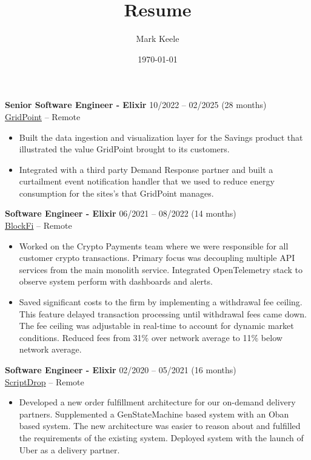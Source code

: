 \documentclass[12pt,letterpaper]{article}
\author{Mark Keele}
\title{Resume}
\date{\today}
\begin{document}
\noindent\textbf{Senior Software Engineer - Elixir}
\hfill{10/2022 -- 02/2025 (28 months)} \\
\href{https://www.gridpoint.com/}{GridPoint} -- Remote

\begin{itemize}

  \item Built the data ingestion and visualization layer for the Savings product that illustrated the value GridPoint brought to its customers.

  \item Integrated with a third party Demand Response partner and built a curtailment event notification handler that we used to reduce energy consumption for the sites's that GridPoint manages.

\end{itemize}

\noindent\textbf{Software Engineer - Elixir}
\hfill{06/2021 -- 08/2022 (14 months)} \\
\href{https://blockfi.com/}{BlockFi} -- Remote

\begin{itemize}

  \item Worked on the Crypto Payments team where we were responsible for all customer crypto transactions. Primary focus was decoupling multiple API services from the main monolith service. Integrated OpenTelemetry stack to observe system perform with dashboards and alerts.

  \item Saved significant costs to the firm by implementing a withdrawal fee ceiling. This feature delayed transaction processing until withdrawal fees came down. The fee ceiling was adjustable in real-time to account for dynamic market conditions. Reduced fees from 31\% over network average to 11\% below network average.

\end{itemize}

\noindent\textbf{Software Engineer - Elixir}
\hfill{02/2020 -- 05/2021 (16 months)} \\
\href{https://scriptdrop.co/}{ScriptDrop} -- Remote

\begin{itemize}

  \item Developed a new order fulfillment architecture for our on-demand delivery partners. Supplemented a GenStateMachine based system with an Oban based system. The new architecture was easier to reason about and fulfilled the requirements of the existing system. Deployed system with the launch of Uber as a delivery partner.

\end{itemize}
\end{document}
